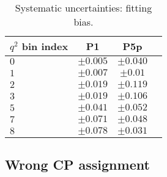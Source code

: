 \begin{table*}[!htb]
  \begin {center}
    \begin{small}
      \caption{Systematic uncertainties: fitting bias.
        \label{tab:fit bias}}
      \begin{tabular}{|l|c|c|c|}
        \hline
        $q^2$ bin index  & P1 & P5p  \\
        \hline
        $ 0 $    &  $\pm0.005$ & $\pm0.040$  \\
        $ 1 $   &  $\pm0.007$  & $\pm0.01$   \\
        $ 2 $    &  $\pm0.019$  & $\pm0.119$  \\
        $ 3 $    &  $\pm0.019$  & $\pm0.106$  \\
        $ 5 $   &  $\pm0.041$   & $\pm0.052$ \\
        $ 7 $   &  $\pm0.071$  & $\pm0.048$  \\
        $ 8 $   &  $\pm0.078$  & $\pm0.031$  \\
        \hline
      \end{tabular}
    \end{small}
  \end{center}
\end{table*}


\subsection{Wrong CP assignment}
\label{sec:sys-mistag}




